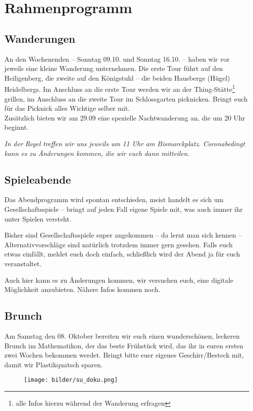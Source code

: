 \section{Rahmenprogramm}
\subsection{Wanderungen}
An den Wochenenden -- Sonntag 09.10. und Sonntag 16.10. -- haben wir vor jeweils eine kleine Wanderung unternehmen. Die erste Tour führt auf den Heiligenberg, die zweite auf den Königstuhl -- die beiden Hausberge (Hügel) Heidelbergs. Im Anschluss an die erste Tour werden wir an der Thing-Stätte\footnote{alle Infos hierzu während der Wanderung erfragen} grillen, im Anschluss an die zweite Tour im Schlossgarten picknicken. Bringt euch für das Picknick alles Wichtige selber mit.\\

Zusätzlich bieten wir am 29.09 eine spezielle Nachtwanderung an, die um 20 Uhr beginnt.

\noindent\emph{In der Regel treffen wir uns jeweils um 11 Uhr am Bismarckplatz. Coronabedingt kann es zu Änderungen kommen, die wir euch dann mitteilen.}

\vfill


\eject

\subsection{Spieleabende}
Das Abendprogramm wird spontan entschieden, meist handelt es sich um Gesellschaftsspiele -- bringt auf jeden Fall eigene Spiele mit, was auch immer ihr unter Spielen versteht.

Bisher sind Gesellschaftsspiele super angekommen -- da lernt man sich kennen -- Alternativvorschläge sind natürlich trotzdem immer gern gesehen. Falls euch etwas einfällt, meldet euch doch einfach, schließlich wird der Abend ja für euch veranstaltet.

Auch hier kann es zu Änderungen kommen, wir versuchen euch, eine digitale Möglichkeit anzubieten. Nähere Infos kommen noch.

\subsection{Brunch}
Am Samstag den 08. Oktober bereiten wir euch einen wunderschönen, leckeren Brunch im \gls{Mathematikon}, der das beste Frühstück wird, das ihr in euren ersten zwei Wochen bekommen werdet. Bringt bitte euer eigenes Geschirr/Besteck mit, damit wir Plastikquatsch sparen.


\vspace{4cm}

\begin{figure}[h]
\centering
\texttt{[image: bilder/su\_doku.png]}
\end{figure}
